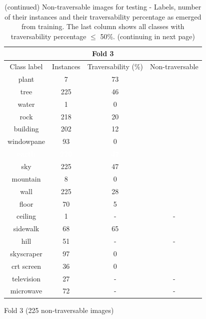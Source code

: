\documentclass[12pt,a4paper,table,dvipsnames,tikz]{report}
\newcommand{\white}[1]{\textbf{\textcolor{white}{#1}}} %
\begin{document}
	\begin{table}[h!]
		\ContinuedFloat %
		\begin{subtable}[h!]{\textwidth}
			\centering
			\begin{tabular}{|c|c|c|c|}
				\hline
				\multicolumn{4}{|c|}{Fold 3}\\
				\hline
				Class label & Instances & Traversability (\%) & Non-traversable\\
				\hline\hline
				plant & 7 & 73 &\\
				\hline
				\rowcolor{tree}
				tree & 225 & 46 & \checkmark\\
				\hline
				water & 1 & 0 & \checkmark\\
				\hline
				rock & 218 & 20 & \checkmark\\
				\hline
				building & 202 & 12 & \checkmark\\
				\hline
				windowpane & 93 & 0 & \checkmark\\
				\hline
				\rowcolor{earth}
				\white{earth} & \white{220} & \white{47} & \white{\checkmark}\\
				\hline
				\rowcolor{sky}
				sky & 225 & 47 & \checkmark\\
				\hline
				mountain & 8 & 0 & \checkmark\\
				\hline
				wall & 225 & 28 & \checkmark\\
				\hline
				floor & 70 & 5 & \checkmark\\
				\hline
				ceiling & 1 & - & -\\
				\hline
				sidewalk & 68 & 65 &\\
				\hline
				hill & 51 & - & -\\
				\hline
				skyscraper & 97 & 0 & \checkmark\\
				\hline
				crt screen & 36 & 0 & \checkmark\\
				\hline
				television & 27 & - & -\\
				\hline
				microwave & 72 & - & -\\
				\hline
			\end{tabular}
			\caption{Fold 3 (225 non-traversable images)}
			\label{table:obst.f3}
		\end{subtable}
		\caption{(continued) Non-traversable images for testing - Labels, number of their instances 
			and their traversability percentage as emerged from training. The last column shows all 
			classes with traversability percentage $\le$ 50\%. (continuing in next page)}
	\end{table}
	
\end{document}
